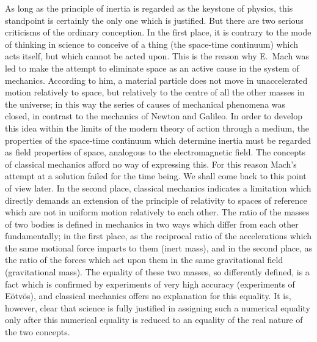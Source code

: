 \documentclass[12pt]{book}[2005/09/16]
\newcommand{\PageSep}[1]{\ignorespaces}
\begin{document}
As long as the principle of inertia is regarded as the
\PageSep{62}
keystone of physics, this standpoint is certainly the only
one which is justified. But there are two serious criticisms
of the ordinary conception. In the first place, it is contrary
to the mode of thinking in science to conceive of a thing
(the space-time continuum) which acts itself, but which
cannot be acted upon. This is the reason why E.~Mach
%
was led to make the attempt to eliminate space as an
active cause in the system of mechanics. According to
him, a material particle does not move in unaccelerated
motion relatively to space, but relatively to the centre of
all the other masses in the universe; in this way the
series of causes of mechanical phenomena was closed, in
contrast to the mechanics of Newton and Galileo. In
order to develop this idea within the limits of the modern
theory of action through a medium, the properties of
the space-time continuum which determine inertia must
be regarded as field properties of space, analogous to
the electromagnetic field. The concepts of classical
mechanics afford no way of expressing this. For this
reason Mach's attempt at a solution failed for the time
being. We shall come back to this point of view later.
In the second place, classical mechanics indicates a
limitation which directly demands an extension of the
principle of relativity to spaces of reference which are not
in uniform motion relatively to each other. The ratio of
the masses of two bodies is defined in mechanics in two
ways which differ from each other fundamentally; in the
first place, as the reciprocal ratio of the accelerations
which the same motional force imparts to them (inert
mass), and in the second place, as the ratio of the forces
\PageSep{63}
which act upon them in the same gravitational field
(gravitational mass). The equality of these two masses,
%
%
%
%
so differently defined, is a fact which is confirmed by
experiments of very high accuracy (experiments of Eötvös),
and classical mechanics offers no explanation for this
equality. It is, however, clear that science is fully justified
in assigning such a numerical equality only after this
numerical equality is reduced to an equality of the real
nature of the two concepts.
\end{document}
